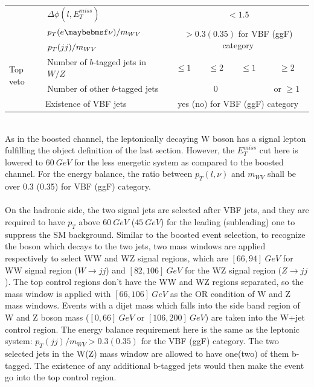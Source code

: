 \begin{table}[t]
\begin{center}
{\begin{tabular}{|l|l|c|c|c|c|}
				\cline{2-6}
				& $\Delta\phi(l,E^{miss}_{T})$ & \multicolumn{4}{c|}{ $<1.5$}\\
				\cline{2-6}
				& $\pt(e\nu) / m_{WV}$ &\multicolumn{4}{c|}{\multirow{2}{*}{$>0.3 (0.35)$ for VBF (ggF) category}}\\
				& $p_{T}(jj) / m_{WV}$ & \multicolumn{4}{c|}{ } \\
				\hline
				\multirow{2}{*}{Top veto} & Number of $b$-tagged jets in $W/Z$ & $\leq 1$ & $\leq 2$ & $\leq 1$ & $\geq2$ \\
				\cline{2-6}
				& Number of other $b$-tagged jets & \multicolumn{3}{c|}{0} & or $\geq 1$ \\
				\hline
				\multicolumn{2}{|c|}{Existence of VBF jets} & \multicolumn{4}{c|}{ yes (no) for VBF (ggF) category } \\
				\hline
			\end{tabular}
		}
	\end{center}
\end{table}
\noindent
\\As in the boosted channel, the leptonically decaying W boson has a signal lepton fulfilling the object definition of the last section. However, the $E_{T}^{miss}$ cut here is lowered to $60~GeV$ for the less energetic system as compared to the boosted channel. For the energy balance, the ratio between $p_{T}(l,\nu)$ and $m_{WV}$ shall be over 0.3 (0.35) for VBF (ggF) category. 
\\
\\On the hadronic side, the two signal jets are selected after VBF jets, and they are required to have $p_{T}$ above $60~GeV$ ($45~GeV$) for the leading (subleading) one to suppress the SM background. Similar to the boosted event selection, to recognize the boson which decays to the two jets, two mass windows are applied respectively to select WW and WZ signal regions, which are $[66, 94]~GeV$ for WW signal region ($W\to jj$) and $[82, 106]~GeV$ for the WZ signal region ($Z\to jj$). The top control regions don't have the WW and WZ regions separated, so the mass window is applied with $[66,106]~GeV$ as the OR condition of W and Z mass windows. Events with a dijet mass which falls into the side band region of W and Z boson mass ($[0,66]~GeV$ or $[106,200]~GeV$) are taken into the W+jet control region. The energy balance requirement here is the same as the leptonic system: $p_{T}(jj)/m_{WV}>0.3(0.35)$ for the VBF (ggF) category. The two selected jets in the W(Z) mass window are allowed to have one(two) of them b-tagged. The existence of any additional b-tagged jets would then make the event go into the top control region.  
